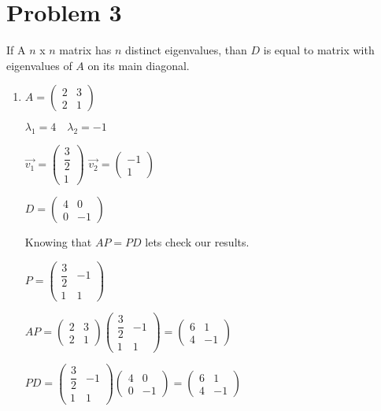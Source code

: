 \documentclass[12pt,letterpaper]{article}
\begin{document}
\section*{Problem 3}
If A $n$ x $n$ matrix has $n$ distinct eigenvalues, than $D$ is equal to matrix with eigenvalues of $A$ on its main diagonal.
\begin{enumerate}[label=(\alph*)]
    \item
        $A = \begin{pmatrix}
            2 & 3 \\
            2 & 1
        \end{pmatrix}$
        
        $\lambda_1 = 4\quad\lambda_2 = -1$
        
        $\vec{v_1} = \begin{pmatrix} \dfrac{3}{2} \\ 1 \end{pmatrix}$
        \quad
        $\vec{v_2} = \begin{pmatrix} -1 \\ 1 \end{pmatrix}$
        
        $D = \begin{pmatrix} 
            4 & 0 \\
            0 & -1
        \end{pmatrix}$
        
        Knowing that $AP = PD$ lets check our results.
        
        $P = \begin{pmatrix} 
            \dfrac{3}{2} & -1 \\ 
            1 & 1 
        \end{pmatrix}$
        
        $AP = \begin{pmatrix}
            2 & 3 \\
            2 & 1
        \end{pmatrix}
        \begin{pmatrix} 
            \dfrac{3}{2} & -1 \\ 
            1 & 1 
        \end{pmatrix} = 
        \begin{pmatrix}
            6 & 1 \\
            4 & -1
        \end{pmatrix}$
        
        $PD = \begin{pmatrix} 
            \dfrac{3}{2} & -1 \\ 
            1 & 1 
        \end{pmatrix}
        \begin{pmatrix} 
            4 & 0 \\
            0 & -1
        \end{pmatrix} = \begin{pmatrix}
            6 & 1 \\
            4 & -1
        \end{pmatrix}$
        

\end{enumerate}
\end{document}
